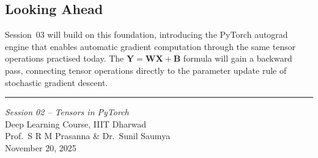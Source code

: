 \documentclass[12pt,a4paper]{article}
\begin{document}
\subsection*{Looking Ahead}

Session~03 will build on this foundation, introducing the PyTorch autograd
engine that enables automatic gradient computation through the same tensor
operations practised today. The $\mathbf{Y} = \mathbf{W}\mathbf{X} + \mathbf{B}$
formula will gain a backward pass, connecting tensor operations directly to
the parameter update rule of stochastic gradient descent.

\vspace{1cm}
\hrule
\vspace{0.5cm}
\begin{center}
  \small
  \textit{Session 02 -- Tensors in PyTorch} \\
  Deep Learning Course, IIIT Dharwad \\
  Prof.\ S R M Prasanna \& Dr.\ Sunil Saumya \\
  November 20, 2025
\end{center}
\end{document}
